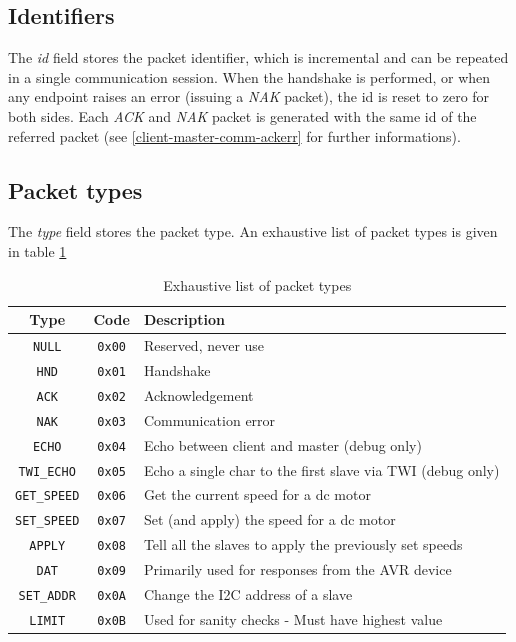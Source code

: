 \documentclass[binding=0.6cm,Lau]{sapthesis}
\begin{document}
\subsection{Identifiers}
The \emph{id} field stores the packet identifier, which is incremental and can
be repeated in a single communication session. When the handshake is performed,
or when any endpoint raises an error (issuing a \emph{NAK} packet), the id is
reset to zero for both sides. Each \emph{ACK} and \emph{NAK} packet is
generated with the same id of the referred packet (see
\ref{client-master-comm-ackerr} for further informations).

\subsection{Packet types}
The \emph{type} field stores the packet type. An exhaustive list of packet
types is given in table \ref{tab:packet-types}

\begin{table}[bh]
  \begin{tabularx}{\textwidth}{c c X}
    \toprule
    Type & Code & Description \\
    \midrule
    \texttt{NULL}       & \texttt{0x00} & Reserved, never use \\
    \texttt{HND}        & \texttt{0x01} & Handshake \\
    \texttt{ACK}        & \texttt{0x02} & Acknowledgement \\
    \texttt{NAK}        & \texttt{0x03} & Communication error \\
    \texttt{ECHO}       & \texttt{0x04} & Echo between client and master (debug only)\\
    \texttt{TWI\_ECHO}  & \texttt{0x05} & Echo a single char to the first slave via TWI (debug only)\\
    \texttt{GET\_SPEED} & \texttt{0x06} & Get the current speed for a dc motor \\
    \texttt{SET\_SPEED} & \texttt{0x07} & Set (and apply) the speed for a dc motor \\
    \texttt{APPLY}      & \texttt{0x08} & Tell all the slaves to apply the previously set speeds \\
    \texttt{DAT}        & \texttt{0x09} & Primarily used for responses from the AVR device \\
    \texttt{SET\_ADDR}  & \texttt{0x0A} & Change the I2C address of a slave \\
    \texttt{LIMIT}      & \texttt{0x0B} & Used for sanity checks - Must have highest value \\
    \bottomrule
  \end{tabularx}
  \caption{Exhaustive list of packet types}
  \label{tab:packet-types}
\end{table}
\end{document}
